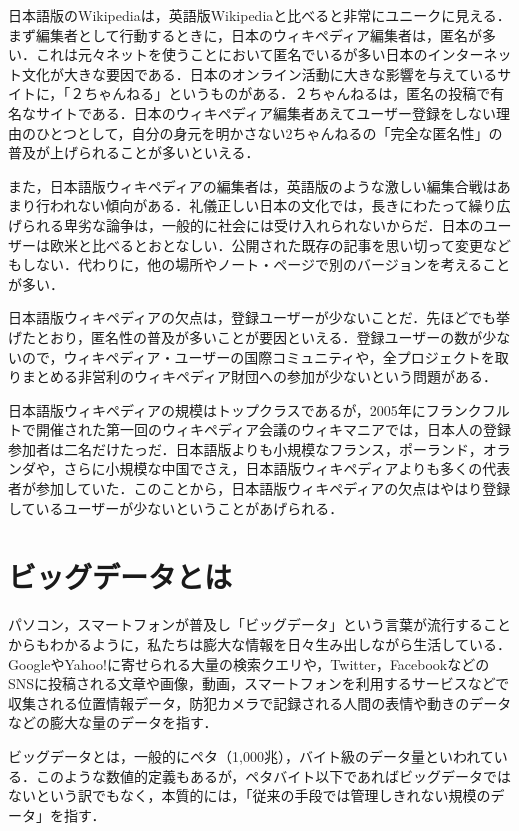 日本語版のWikipediaは，英語版Wikipediaと比べると非常にユニークに見える．まず編集者として行動するときに，日本のウィキペディア編集者は，匿名が多い．これは元々ネットを使うことにおいて匿名でいるが多い日本のインターネット文化が大きな要因である．日本のオンライン活動に大きな影響を与えているサイトに，「２ちゃんねる」というものがある．２ちゃんねるは，匿名の投稿で有名なサイトである．日本のウィキペディア編集者あえてユーザー登録をしない理由のひとつとして，自分の身元を明かさない2ちゃんねるの「完全な匿名性」の普及が上げられることが多いといえる．

また，日本語版ウィキペディアの編集者は，英語版のような激しい編集合戦はあまり行われない傾向がある．礼儀正しい日本の文化では，長きにわたって繰り広げられる卑劣な論争は，一般的に社会には受け入れられないからだ．日本のユーザーは欧米と比べるとおとなしい．公開された既存の記事を思い切って変更などもしない．代わりに，他の場所やノート・ページで別のバージョンを考えることが多い．

日本語版ウィキペディアの欠点は，登録ユーザーが少ないことだ．先ほどでも挙げたとおり，匿名性の普及が多いことが要因といえる．登録ユーザーの数が少ないので，ウィキペディア・ユーザーの国際コミュニティや，全プロジェクトを取りまとめる非営利のウィキペディア財団への参加が少ないという問題がある．

日本語版ウィキペディアの規模はトップクラスであるが，2005年にフランクフルトで開催された第一回のウィキペディア会議のウィキマニアでは，日本人の登録参加者は二名だけたっだ．日本語版よりも小規模なフランス，ポーランド，オランダや，さらに小規模な中国でさえ，日本語版ウィキペディアよりも多くの代表者が参加していた．このことから，日本語版ウィキペディアの欠点はやはり登録しているユーザーが少ないということがあげられる．




\section{ビッグデータとは}

パソコン，スマートフォンが普及し「ビッグデータ」という言葉が流行することからもわかるように，私たちは膨大な情報を日々生み出しながら生活している．GoogleやYahoo!に寄せられる大量の検索クエリや，Twitter，FacebookなどのSNSに投稿される文章や画像，動画，スマートフォンを利用するサービスなどで収集される位置情報データ，防犯カメラで記録される人間の表情や動きのデータなどの膨大な量のデータを指す．

ビッグデータとは，一般的にペタ（1,000兆），バイト級のデータ量といわれている．このような数値的定義もあるが，ペタバイト以下であればビッグデータではないという訳でもなく，本質的には，「従来の手段では管理しきれない規模のデータ」を指す．

